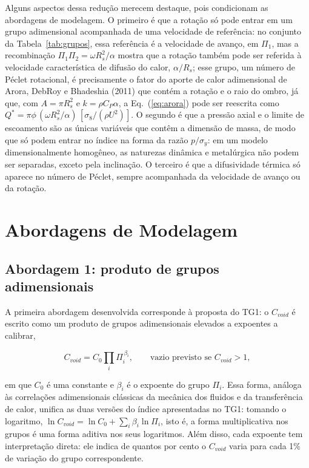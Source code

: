 \documentclass[12pt,openany]{report}
\begin{document}
Alguns aspectos dessa redução merecem destaque, pois condicionam as abordagens de modelagem. O primeiro é que a rotação só pode entrar em um grupo adimensional acompanhada de uma velocidade de referência: no conjunto da Tabela~\ref{tab:grupos}, essa referência é a velocidade de avanço, em $\Pi_1$, mas a recombinação $\Pi_1\Pi_2 = \omega R_{s}^{2}/\alpha$ mostra que a rotação também pode ser referida à velocidade característica de difusão do calor, $\alpha/R_s$; esse grupo, um número de Péclet rotacional, é precisamente o fator do aporte de calor adimensional de Arora, DebRoy e Bhadeshia (2011) que contém a rotação e o raio do ombro, já que, com $A = \pi R_{s}^{2}$ e $k = \rho C_P \alpha$, a Eq.~(\ref{eq:arora}) pode ser reescrita como $Q^{*} = \pi\phi\,(\omega R_{s}^{2}/\alpha)\,[\sigma_{8}/(\rho U^{2})]$. O segundo é que a pressão axial e o limite de escoamento são as únicas variáveis que contêm a dimensão de massa, de modo que só podem entrar no índice na forma da razão $p/\sigma_y$: em um modelo dimensionalmente homogêneo, as naturezas dinâmica e metalúrgica não podem ser separadas, exceto pela inclinação. O terceiro é que a difusividade térmica só aparece no número de Péclet, sempre acompanhada da velocidade de avanço ou da rotação.

\section{Abordagens de Modelagem}
\label{sec:abordagens}

\subsection{Abordagem 1: produto de grupos adimensionais}
\label{sec:abordagem_b}

A primeira abordagem desenvolvida corresponde à proposta do TG1: o $C_{void}$ é escrito como um produto de grupos adimensionais elevados a expoentes a calibrar,

\begin{equation}
C_{void} = C_0 \prod_{i} \Pi_{i}^{\,\beta_i}, \qquad \text{vazio previsto se } C_{void} > 1,
\label{eq:cvoid_b}
\end{equation}

\noindent em que $C_0$ é uma constante e $\beta_i$ é o expoente do grupo $\Pi_i$. Essa forma, análoga às correlações adimensionais clássicas da mecânica dos fluidos e da transferência de calor, unifica as duas versões do índice apresentadas no TG1: tomando o logaritmo, $\ln C_{void} = \ln C_0 + \sum_i \beta_i \ln \Pi_i$, isto é, a forma multiplicativa nos grupos é uma forma aditiva nos seus logaritmos. Além disso, cada expoente tem interpretação direta: ele indica de quantos por cento o $C_{void}$ varia para cada 1\% de variação do grupo correspondente.
\end{document}
